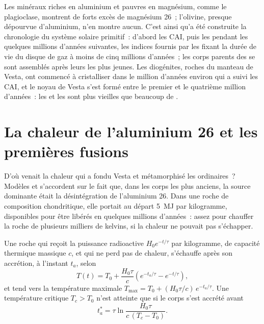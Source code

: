 Les minéraux riches en aluminium et pauvres en magnésium, comme le plagioclase, montrent de
forts excès de magnésium 26~; l'olivine, presque dépourvue d'aluminium, n'en montre aucun.
C'est ainsi qu'a été construite la chronologie du système solaire primitif~: d'abord les
CAI, puis les  pendant les quelques millions d'années suivantes, les indices
fournis par les  fixant la durée de vie du disque de gaz à moins de cinq millions
d'années~; les corps parents des  se sont assemblés après leurs  les plus
jeunes. Les diogénites, roches du manteau de Vesta, ont commencé à cristalliser dans le
million d'années environ qui a suivi les CAI, et le noyau de Vesta s'est formé entre le
premier et le quatrième million d'années~: les  et les  sont
plus vieilles que beaucoup de .

\section{La chaleur de l'aluminium 26 et les premières fusions}

D'où venait la chaleur qui a fondu Vesta et métamorphisé les  ordinaires~? Modèles et 
s'accordent sur le fait que, dans les corps les plus anciens, la source dominante était la désintégration de
l'aluminium 26. Dans une roche de composition chondritique, elle portait au départ \qty{5}{MJ} par kilogramme,
disponibles pour être libérés en quelques millions d'années~: assez pour chauffer la roche de plusieurs milliers
de kelvins, si la chaleur ne pouvait pas s'échapper.

\begin{proposition}
\label{prop:b2:planet-formation-meteorites:heating}
Une roche qui reçoit la puissance radioactive $H_0 e^{-t/\tau}$ par kilogramme, de
capacité thermique massique $c$, et qui ne perd pas de chaleur, s'échauffe après son
accrétion, à l'instant $t_a$, selon
\[
  T(t) = T_0 + \frac{H_0\tau}{c}\left(e^{-t_a/\tau} - e^{-t/\tau}\right),
\]
et tend vers la température maximale
$T_{\max} = T_0 + (H_0\tau/c)\,e^{-t_a/\tau}$. Une température critique
$T_c > T_0$ n'est atteinte que si le corps s'est accrété avant
\[
  t_a^* = \tau\ln\frac{H_0\tau}{c\,(T_c - T_0)}.
\]
\end{proposition}

